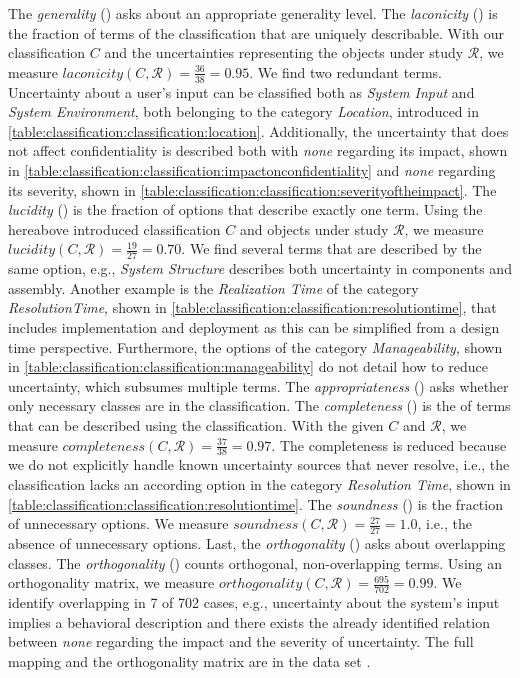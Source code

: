The \emph{generality} () asks about an appropriate generality level.
The \emph{laconicity} () is the fraction of terms of the classification that are uniquely describable.
With our classification $C$ and the uncertainties representing the objects under study $\mathcal{R}$, we measure $laconicity(C,\mathcal{R}) = \frac{36}{38} = 0.95$.
We find two redundant terms.
Uncertainty about a user's input can be classified both as \emph{System Input} and \emph{System Environment}, both belonging to the category \emph{Location}, introduced in \autoref{table:classification:classification:location}.
Additionally, the uncertainty that does not affect confidentiality is described both with \emph{none} regarding its impact, shown in \autoref{table:classification:classification:impactonconfidentiality} and \emph{none} regarding its severity, shown in \autoref{table:classification:classification:severityoftheimpact}.
The \emph{lucidity} () is the fraction of options that describe exactly one term.
Using the hereabove introduced classification $C$ and objects under study $\mathcal{R}$, we measure $lucidity(C,\mathcal{R}) = \frac{19}{27} = 0.70$.
We find several terms that are described by the same option, e.g., \emph{System Structure} describes both uncertainty in components and assembly.
Another example is the \emph{Realization Time} of the category \emph{ResolutionTime}, shown in \autoref{table:classification:classification:resolutiontime}, that includes implementation and deployment as this can be simplified from a design time perspective.
Furthermore, the options of the category \emph{Manageability}, shown in \autoref{table:classification:classification:manageability} do not detail how to reduce uncertainty, which subsumes multiple terms.
The \emph{appropriateness} () asks whether only necessary classes are in the classification.
The \emph{completeness} () is the of terms that can be described using the classification.
With the given $C$ and $\mathcal{R}$, we measure $completeness(C,\mathcal{R}) = \frac{37}{38} = 0.97$.
The completeness is reduced because we do not explicitly handle known uncertainty sources that never resolve, i.e., the classification lacks an according option in the category \emph{Resolution Time}, shown in \autoref{table:classification:classification:resolutiontime}.
The \emph{soundness} () is the fraction of unnecessary options.
We measure $soundness(C,\mathcal{R}) = \frac{27}{27} = 1.0$, i.e., the absence of unnecessary options.
Last, the \emph{orthogonality} () asks about overlapping classes.
The \emph{orthogonality} () counts orthogonal, non-overlapping terms.
Using an orthogonality matrix, we measure $orthogonality(C,\mathcal{R}) = \frac{695}{702} = 0.99$.
We identify overlapping in 7 of 702 cases, e.g., uncertainty about the system's input implies a behavioral description and there exists the already identified relation between \emph{none} regarding the impact and the severity of uncertainty.
The full mapping and the orthogonality matrix are in the data set \cite{dataset}.

